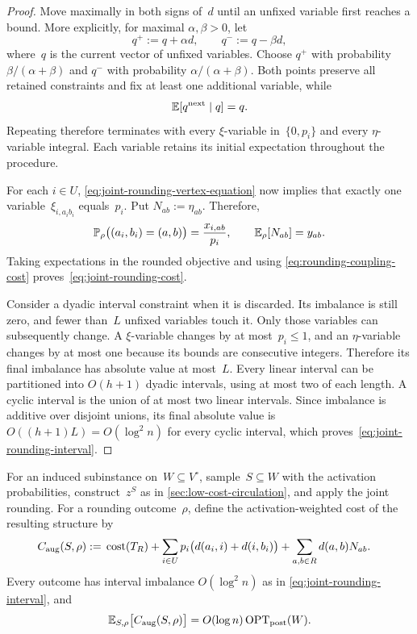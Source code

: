 \documentclass[12pt,a4paper,oneside]{report}
\begin{document}
\begin{proof}
Move maximally in both signs of~$d$ until an unfixed variable first
reaches a bound.  More explicitly, for maximal $\alpha,\beta>0$, let
\[
    q^+:=q+\alpha d,
    \qquad
    q^-:=q-\beta d,
\]
where~$q$ is the current vector of unfixed variables.  Choose $q^+$ with probability $\beta/(\alpha+\beta)$ and $q^-$
with probability $\alpha/(\alpha+\beta)$.  Both points preserve all retained
constraints and fix at least one additional variable, while
\[
    \mathbb{E}[q^{\mathrm{next}}\mid q]=q.
\]
Repeating therefore terminates with every $\xi$-variable in~$\{0,p_i\}$ and
every $\eta$-variable integral.  Each variable retains its initial expectation
throughout the procedure.

For each $i\in U$, \cref{eq:joint-rounding-vertex-equation} now implies that
exactly one variable~$\xi_{i,a_ib_i}$ equals~$p_i$.  Put
$N_{ab}:=\eta_{ab}$.  Therefore,
\[
    \mathbb{P}_\rho\bigl((a_i,b_i)=(a,b)\bigr)=\frac{x_{i,ab}}{p_i},
    \qquad
    \mathbb{E}_\rho[N_{ab}]=y_{ab}.
\]
Taking expectations in the rounded objective and using
\cref{eq:rounding-coupling-cost} proves~\cref{eq:joint-rounding-cost}.

Consider a dyadic interval constraint when it is discarded.  Its imbalance
is still zero, and fewer than~$L$ unfixed variables touch it.  Only those
variables can subsequently change.  A $\xi$-variable changes by at
most~$p_i\le1$, and an $\eta$-variable changes by at most one because its
bounds are consecutive integers.  Therefore its final imbalance has absolute
value at most~$L$.
Every linear interval can be partitioned into $O(h+1)$ dyadic intervals,
using at most two of each length.  A cyclic interval is the union of at most
two linear intervals.  Since imbalance is additive over disjoint unions, its
final absolute value is $O((h+1)L)=O(\log^2 n)$ for every cyclic interval,
which proves~\cref{eq:joint-rounding-interval}.
\end{proof}

\begin{theorem}
\label{thm:rounded-backbone-chord-structure}
For an induced subinstance on~$W\subseteq V^\circ$, sample~$S\subseteq W$
with the activation probabilities, construct~$z^S$ as in
\cref{sec:low-cost-circulation}, and apply the joint rounding.  For a rounding
outcome~$\rho$, define the activation-weighted cost of the resulting structure
by
\begin{align*}
    C_{\mathrm{aug}}(S,\rho)
    &:={}
      \operatorname{cost}(T_R)
      +\sum_{i\in U}p_i\bigl(d(a_i,i)+d(i,b_i)\bigr)
      +\sum_{a,b\in R}d(a,b)N_{ab}.
\end{align*}
Every outcome has interval imbalance $O(\log^2 n)$ as in
\cref{eq:joint-rounding-interval}, and
\[
    \mathbb{E}_{S,\rho}\bigl[C_{\mathrm{aug}}(S,\rho)\bigr]
    =O(\log n)\operatorname{OPT}_\mathrm{post}(W).
\]
\end{theorem}
\end{document}
